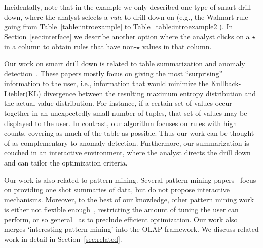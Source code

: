 Incidentally, note that in the example we only described one type of smart drill down,
where the analyst selects a {\em rule} to drill down on
(e.g., the Walmart rule going from Table~\ref{table:introexample} to
Table~\ref{table:introexample2}).
In Section~\ref{sec:interface} we describe another option
where the analyst clicks on a $\star$ in a column to obtain
rules that have non-$\star$ values in that column.

Our work on smart drill down is related
to table summarization and anomaly
detection~\cite{Sarawagi:2001:UMA:767141.767148,
Sarawagi00user-adaptiveexploration,
Sarawagi98discovery-drivenexploration,
DBLP:journals/pvldb/GebalyAGKS14}.
These papers mostly focus on
giving the most ``surprising'' information to the user, i.e., information
that would minimize the Kullback-Liebler(KL) divergence between the
resulting maximum entropy distribution and the actual value distribution. For instance, if a certain set of
values occur together in an unexpectedly small number of tuples, that
set of values may be displayed to the user. In contrast, our algorithm
focuses on rules with high counts, covering as
much of the table as possible. Thus our work can be thought of as complementary to anomaly detection.
Furthermore, our summarization is couched in
an interactive environment, where the analyst
directs the drill down and can tailor the optimization criteria.

Our work is also related to pattern mining. Several pattern mining papers~\cite{Vreeken:2011:KMI:1969593.1969615,Bringmann:2007:ICDM,Yan:2005:SIP:1081870.1081907} focus on providing one shot summaries of data, but do not propose interactive mechanisms. Moreover, to the best of our knowledge, other pattern mining work is either not flexible enough~\cite{Goethals:2011:MFI:2020408.2020529,Tatti:2014:FRI:2676651.2656261,DeBie:2010:FMI:1816112.1816117}, restricting the amount of tuning the user can perform, or so general~\cite{Leeuwen:2012:DSS:2347179.2347243} as to preclude efficient optimization. Our work also merges `interesting pattern mining' into the OLAP framework. We discuss related work in detail in Section~\ref{sec:related}.

